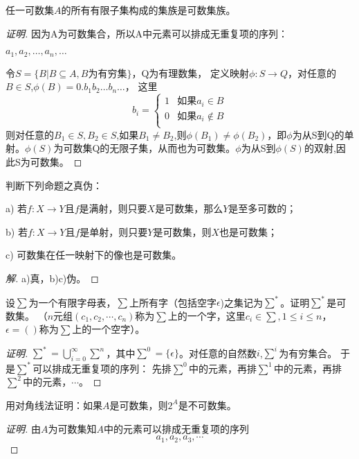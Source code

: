 \documentclass{article}
\begin{document}
\begin{CJK}{UTF8}{gbsn}
\clearpage
\begin{Exercise}
  任一可数集$A$的所有有限子集构成的集族是可数集族。
\end{Exercise}
\begin{proof}[证明]
  因为A为可数集合，所以A中元素可以排成无重复项的序列：

  $a_1,a_2,\ldots,a_n,\ldots$

令$S=\{B|B\subseteq A,B\text{为有穷集}\}$，Q为有理数集，
定义映射$\phi:S\to Q$，对任意的$B\in S$,$\phi(B)=0.b_1b_2\ldots b_n\ldots$，
这里
\[
b_i=\begin{cases}
  1&\text{如果}a_i\in B\\
  0&\text{如果}a_i\notin B\\
\end{cases}  
\]
则对任意的$B_1\in S, B_2\in S$,如果$B_1\neq B_2$,则$\phi(B_1)\neq \phi(B_2)$，即$\phi$为从S到Q的单射。$\phi(S)$为可数集Q的无限子集，从而也为可数集。$\phi$为从S到$\phi(S)$的双射,因此S为可数集。
\end{proof}
\begin{Exercise}
  判断下列命题之真伪：

 a) 若$f:X\to Y$且$f$是满射，则只要$X$是可数集，那么$Y$是至多可数的；

 b) 若$f:X\to Y$且$f$是单射，则只要$Y$是可数集，则$X$也是可数集；

 c) 可数集在任一映射下的像也是可数集。
\end{Exercise}
\begin{proof}[解]
a)真，b)c)伪。
\end{proof}
\begin{Exercise}
  设$\sum$为一个有限字母表，$\sum$上所有字（包括空字$\epsilon$)之集记为$\sum^*$。证明$\sum^*$是可数集。
  （$n$元组$(c_1,c_2,\cdots,c_n)$称为$\sum$上的一个字，这里$c_i\in \sum, 1\leq i\leq n$，$\epsilon=()$称为$\sum$上的一个空字）。
\end{Exercise}
\begin{proof}[证明]
$\sum^*=\bigcup_{i=0}^{\infty}\sum^n$，其中$\sum^0=\{\epsilon\}$。对任意的自然数$i$,$\sum^i$为有穷集合。
于是$\sum^*$可以排成无重复项的序列：
先排$\sum^0$中的元素，再排$\sum^1$中的元素，再排$\sum^2$中的元素，$\cdots$。
\end{proof}
\begin{Exercise}
  用对角线法证明：如果$A$是可数集，则$2^A$是不可数集。
\end{Exercise}
\begin{proof}[证明]
  由$A$为可数集知$A$中的元素可以排成无重复项的序列
 \[a_1,a_2,a_3,\cdots\]


\end{proof}
\end{CJK}
\end{document}
